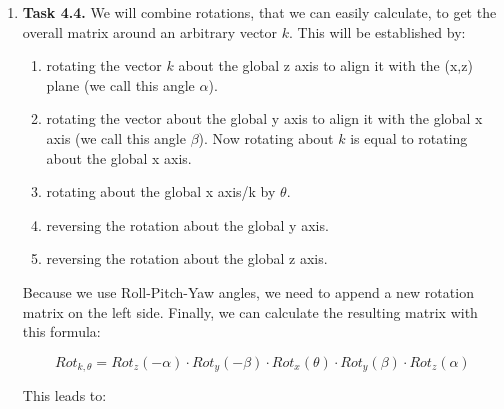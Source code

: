 \documentclass[a4paper,11pt]{article}
\begin{document}
\begin {enumerate}
	\item[\textbf{Task 4.4.}]
		We will combine rotations, that we can easily calculate, to get the overall matrix around an arbitrary vector $k$. This will be established by:
		\begin{enumerate}
			\item rotating the vector $k$ about the global z axis to align it with the (x,z) plane (we call this angle $\alpha$).
			\item rotating the vector about the global y axis to align it with the global x axis (we call this angle $\beta$). Now rotating about $k$ is equal to rotating about the global x axis.
			\item rotating about the global x axis/k by $\theta$.
			\item reversing the rotation about the global y axis.
			\item reversing the rotation about the global z axis.
		\end{enumerate}

		Because we use Roll-Pitch-Yaw angles, we need to append a new rotation matrix on the left side.	 Finally, we can calculate the resulting matrix with this formula:

		$$Rot_{k, \theta} = Rot_{z}(-\alpha) \cdot Rot_{y}(-\beta) \cdot Rot_{x}(\theta) \cdot Rot_{y}(\beta) \cdot Rot_{z}(\alpha)$$

		This leads to:


\end{enumerate}
\end{document}
